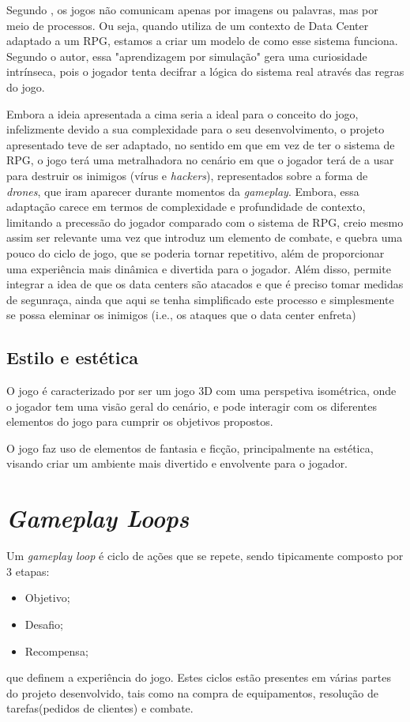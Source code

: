 Segundo \textcite{bogost}, os jogos não comunicam apenas por imagens ou palavras, mas por meio de processos. Ou seja, quando utiliza de 
um contexto de Data Center adaptado a um \ac{RPG}, estamos a criar 
um modelo de como esse sistema funciona. Segundo o autor, essa 
"aprendizagem por simulação" gera uma curiosidade intrínseca, 
pois o jogador tenta decifrar a lógica do sistema real através 
das regras do jogo.

Embora a ideia apresentada a cima seria a ideal para o conceito do jogo, infelizmente
devido a sua complexidade para o seu desenvolvimento, o projeto apresentado teve de ser
adaptado, no sentido em que em vez de ter o sistema de \ac{RPG}, o jogo terá uma
metralhadora no cenário em que o jogador terá de a usar para destruir os inimigos (vírus e \textit{hackers}), representados sobre a forma de \textit{drones},
que iram aparecer durante momentos da \textit{gameplay}.
Embora, essa adaptação carece em termos de complexidade e profundidade de contexto,
limitando a precessão do jogador comparado com o sistema de \ac{RPG}, creio mesmo assim
ser relevante uma vez que introduz um elemento de combate, e quebra uma pouco do ciclo de jogo,
que se poderia tornar repetitivo, além de proporcionar uma experiência mais dinâmica e divertida para o jogador.
Além disso, permite integrar a idea de que os data centers são atacados e que é preciso tomar medidas de segunraça,
ainda que aqui se tenha simplificado este processo e simplesmente se possa eleminar os inimigos (i.e., os ataques que o data center enfreta)

\subsection{Estilo e estética}

O jogo é caracterizado por ser um jogo 3D com uma perspetiva isométrica, onde 
o jogador tem uma visão geral do cenário, e pode interagir com os diferentes 
elementos do jogo para cumprir os objetivos propostos.

O jogo faz uso de elementos de fantasia e ficção, principalmente na estética, visando criar um ambiente mais divertido e envolvente para o jogador.

\section{\textit{Gameplay Loops}}

Um \textit{gameplay loop} é ciclo de ações que se repete, sendo tipicamente composto por 3 etapas:
\begin{itemize}
    \item Objetivo;
    \item Desafio;
    \item Recompensa;
\end{itemize}
que definem a experiência do jogo.
Estes ciclos estão presentes em várias partes do projeto desenvolvido, tais como na compra de equipamentos, resolução de tarefas(pedidos de clientes) e combate.

